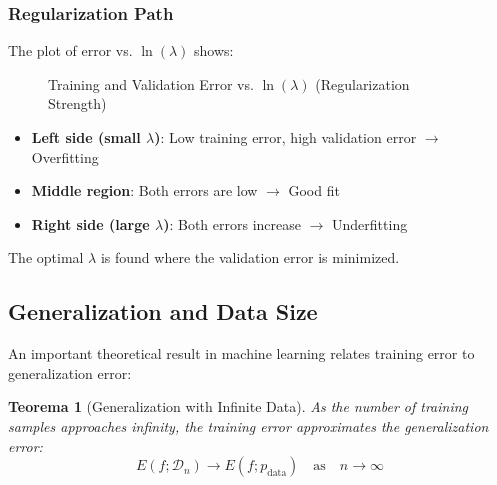 \documentclass[11pt,a4paper]{article}
\theoremstyle{definition}
\theoremstyle{plain}
\newtheorem{theorem}{Teorema}[section]
\theoremstyle{remark}
\begin{document}
\subsubsection{Regularization Path}

The plot of error vs. $\ln(\lambda)$ shows:

\begin{figure}[h]
\centering
{}
\caption{Training and Validation Error vs. $\ln(\lambda)$ (Regularization Strength)}
\end{figure}

\begin{itemize}
    \item \textbf{Left side (small $\lambda$)}: Low training error, high validation error $\rightarrow$ Overfitting
    \item \textbf{Middle region}: Both errors are low $\rightarrow$ Good fit
    \item \textbf{Right side (large $\lambda$)}: Both errors increase $\rightarrow$ Underfitting
\end{itemize}

The optimal $\lambda$ is found where the validation error is minimized.

\subsection{Generalization and Data Size}

An important theoretical result in machine learning relates training error to generalization error:

\begin{theorem}[Generalization with Infinite Data]
As the number of training samples approaches infinity, the training error approximates the generalization error:
\[
E(f; \mathcal{D}_n) \to E(f; p_{\text{data}}) \quad \text{as} \quad n \to \infty
\]
\end{theorem}
\end{document}
